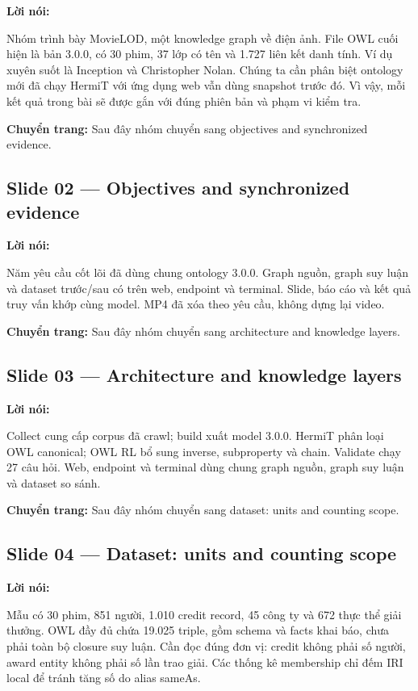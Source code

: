 \documentclass[
  11pt,
]{article}
\begin{document}
\textbf{Lời nói:}

Nhóm trình bày MovieLOD, một knowledge graph về điện ảnh. File OWL cuối
hiện là bản 3.0.0, có 30 phim, 37 lớp có tên và 1.727 liên kết danh
tính. Ví dụ xuyên suốt là Inception và Christopher Nolan. Chúng ta cần
phân biệt ontology mới đã chạy HermiT với ứng dụng web vẫn dùng snapshot
trước đó. Vì vậy, mỗi kết quả trong bài sẽ được gắn với đúng phiên bản
và phạm vi kiểm tra.

\textbf{Chuyển trang:} Sau đây nhóm chuyển sang objectives and
synchronized evidence.

\subsection{Slide 02 --- Objectives and synchronized
evidence}\label{slide-02-objectives-and-synchronized-evidence}

\textbf{Lời nói:}

Năm yêu cầu cốt lõi đã dùng chung ontology 3.0.0. Graph nguồn, graph suy
luận và dataset trước/sau có trên web, endpoint và terminal. Slide, báo
cáo và kết quả truy vấn khớp cùng model. MP4 đã xóa theo yêu cầu, không
dựng lại video.

\textbf{Chuyển trang:} Sau đây nhóm chuyển sang architecture and
knowledge layers.

\subsection{Slide 03 --- Architecture and knowledge
layers}\label{slide-03-architecture-and-knowledge-layers}

\textbf{Lời nói:}

Collect cung cấp corpus đã crawl; build xuất model 3.0.0. HermiT phân
loại OWL canonical; OWL RL bổ sung inverse, subproperty và chain.
Validate chạy 27 câu hỏi. Web, endpoint và terminal dùng chung graph
nguồn, graph suy luận và dataset so sánh.

\textbf{Chuyển trang:} Sau đây nhóm chuyển sang dataset: units and
counting scope.

\subsection{Slide 04 --- Dataset: units and counting
scope}\label{slide-04-dataset-units-and-counting-scope}

\textbf{Lời nói:}

Mẫu có 30 phim, 851 người, 1.010 credit record, 45 công ty và 672 thực
thể giải thưởng. OWL đầy đủ chứa 19.025 triple, gồm schema và facts khai
báo, chưa phải toàn bộ closure suy luận. Cần đọc đúng đơn vị: credit
không phải số người, award entity không phải số lần trao giải. Các thống
kê membership chỉ đếm IRI local để tránh tăng số do alias sameAs.
\end{document}
